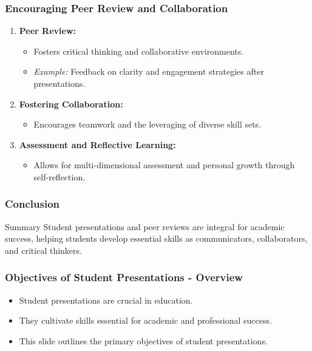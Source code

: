 \documentclass{beamer}
\begin{document}
\begin{frame}[fragile]
    \frametitle{Encouraging Peer Review and Collaboration}
    \begin{enumerate}
        \item \textbf{Peer Review:}
        \begin{itemize}
            \item Fosters critical thinking and collaborative environments.
            \item \textit{Example:} Feedback on clarity and engagement strategies after presentations.
        \end{itemize}
        
        \item \textbf{Fostering Collaboration:}
        \begin{itemize}
            \item Encourages teamwork and the leveraging of diverse skill sets.
        \end{itemize}
        
        \item \textbf{Assessment and Reflective Learning:}
        \begin{itemize}
            \item Allows for multi-dimensional assessment and personal growth through self-reflection.
        \end{itemize}
    \end{enumerate}
\end{frame}

\begin{frame}[fragile]
    \frametitle{Conclusion}
    \begin{block}{Summary}
        Student presentations and peer reviews are integral for academic success, helping students develop essential skills as communicators, collaborators, and critical thinkers.
    \end{block}
\end{frame}

\begin{frame}[fragile]
    \frametitle{Objectives of Student Presentations - Overview}
    \begin{itemize}
        \item Student presentations are crucial in education.
        \item They cultivate skills essential for academic and professional success.
        \item This slide outlines the primary objectives of student presentations.
    \end{itemize}
\end{frame}
\end{document}
